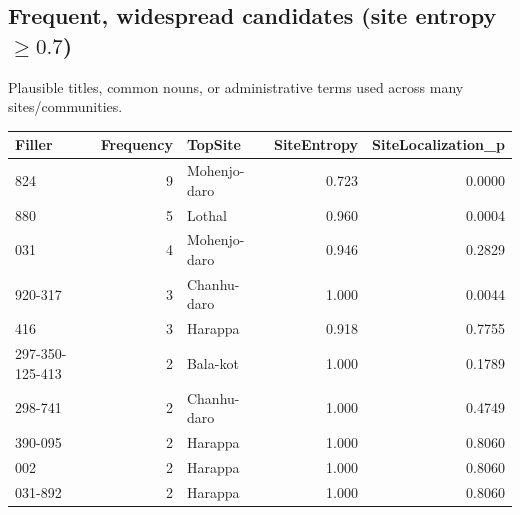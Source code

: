 \subsection{Frequent, widespread candidates (site entropy $\geq 0.7$)}
Plausible titles, common nouns, or administrative terms used across many
sites/communities.
\begin{tabular}{lrlrr}
\toprule
\textbf{Filler} & \textbf{Frequency} & \textbf{TopSite} & \textbf{SiteEntropy} & \textbf{SiteLocalization\_p} \\
\midrule
824 & 9 & Mohenjo-daro & 0.723 & 0.0000 \\
880 & 5 & Lothal & 0.960 & 0.0004 \\
031 & 4 & Mohenjo-daro & 0.946 & 0.2829 \\
920-317 & 3 & Chanhu-daro & 1.000 & 0.0044 \\
416 & 3 & Harappa & 0.918 & 0.7755 \\
297-350-125-413 & 2 & Bala-kot & 1.000 & 0.1789 \\
298-741 & 2 & Chanhu-daro & 1.000 & 0.4749 \\
390-095 & 2 & Harappa & 1.000 & 0.8060 \\
002 & 2 & Harappa & 1.000 & 0.8060 \\
031-892 & 2 & Harappa & 1.000 & 0.8060 \\
\bottomrule
\end{tabular}
